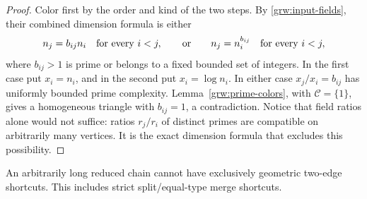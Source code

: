 \begin{proof}
Color first by the order and kind of the two steps.  By
\ref{grw:input-fields}, their combined dimension formula is either
\[
 n_j=b_{ij}n_i\quad\hbox{for every }i<j,
 \qquad\hbox{or}\qquad
 n_j=n_i^{b_{ij}}\quad\hbox{for every }i<j,
\]
where $b_{ij}>1$ is prime or belongs to a fixed bounded set of integers.
In the first case put $x_i=n_i$, and in the second put $x_i=\log n_i$.
In either case $x_j/x_i=b_{ij}$ has uniformly bounded prime complexity.
Lemma~\ref{grw:prime-colors}, with $\mathcal C=\{1\}$, gives a
homogeneous triangle with $b_{ij}=1$, a contradiction.  Notice that
field ratios alone would not suffice: ratios $r_j/r_i$ of distinct
primes are compatible on arbitrarily many vertices.  It is the exact
dimension formula that excludes this possibility.
\end{proof}

\begin{proposition}\label{grw:no-geometric}
An arbitrarily long reduced chain cannot have exclusively geometric
two-edge shortcuts.  This includes strict split/equal-type merge
shortcuts.
\end{proposition}


